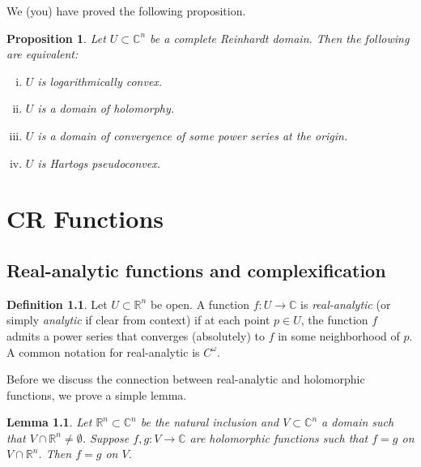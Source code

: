 \documentclass[12pt,openany]{book}
\newcommand{\C}{{\mathbb{C}}}
\newcommand{\R}{{\mathbb{R}}}
\newcommand{\myindex}[1]{#1\index{#1}}
\theoremstyle{plain}
\newtheorem{lemma}[thm]{Lemma}
\newtheorem{prop}[thm]{Proposition}
\theoremstyle{remark}
\theoremstyle{definition}
\newtheorem{defn}[thm]{Definition}
\theoremstyle{exercise}
\theoremstyle{example}
\begin{document}
\pagebreak[2]
We (you) have proved the following proposition.

\begin{prop}
\pagebreak[2]
Let $U \subset \C^n$ be a complete Reinhardt domain.  Then the following are
equivalent:
\begin{enumerate}[(i)]
\item
$U$ is logarithmically convex.
\item
$U$ is a domain of holomorphy.
\item
$U$ is a domain of convergence of some power series at the origin.
\item
$U$ is Hartogs pseudoconvex.
\end{enumerate}
\end{prop}


\chapter{CR Functions} \label{ch:crfunctions}


\section{Real-analytic functions and complexification}

\begin{defn}
Let $U \subset \R^n$ be open.
A function $f \colon U \to \C$ is
\emph{\myindex{real-analytic}} (or simply \emph{analytic} if
clear from context) if at each point $p \in U$, the function $f$
admits a power series that converges (absolutely) to $f$ in some
neighborhood of $p$.
%
A common notation for real-analytic is $C^\omega$.
\end{defn}

Before we discuss the connection between real-analytic and holomorphic functions,
we prove a simple lemma.

\begin{lemma} \label{lemma:sameonRn}
Let $\R^n \subset \C^n$ be the natural inclusion and
$V \subset \C^n$ a domain such that $V \cap \R^n \neq \emptyset$.
Suppose $f,g \colon V \to \C$ are holomorphic functions such that
$f=g$ on $V \cap \R^n$.  Then $f=g$ on $V$.
\end{lemma}
\end{document}
